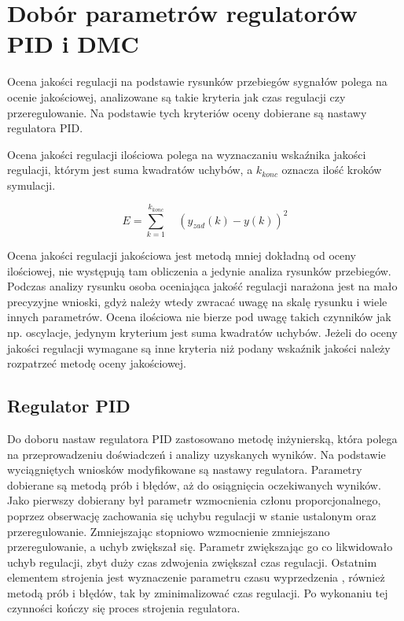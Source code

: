 \section{Dobór parametrów regulatorów PID i DMC}
Ocena jakości regulacji na podstawie rysunków przebiegów sygnałów polega na ocenie jakościowej, 
analizowane są takie kryteria jak czas regulacji czy przeregulowanie. 
Na podstawie tych kryteriów oceny dobierane są nastawy regulatora PID.

Ocena jakości regulacji ilościowa polega na wyznaczaniu wskaźnika jakości regulacji, 
którym jest suma kwadratów uchybów, a $k_{konc}$ oznacza ilość kroków symulacji. 



$$
E=\sum_{k=1}^{k_{konc}} \quad (y_{zad}(k)-y(k))^{2}
$$

Ocena jakości regulacji jakościowa jest metodą mniej dokładną od oceny ilościowej, 
nie występują tam obliczenia a jedynie analiza rysunków przebiegów. 
Podczas analizy rysunku osoba oceniająca jakość regulacji narażona jest na mało precyzyjne wnioski, 
gdyż należy wtedy zwracać uwagę na skalę rysunku i wiele innych parametrów. 
Ocena ilościowa nie bierze pod uwagę takich czynników jak np. oscylacje, 
jedynym kryterium jest suma kwadratów uchybów. 
Jeżeli do oceny jakości regulacji wymagane są inne kryteria niż podany wskaźnik jakości 
należy rozpatrzeć metodę oceny jakościowej.

\subsection{Regulator PID}

Do doboru nastaw regulatora PID zastosowano metodę inżynierską, 
która polega na przeprowadzeniu doświadczeń i analizy uzyskanych wyników. 
Na podstawie wyciągniętych wniosków modyfikowane są nastawy regulatora. 
Parametry  dobierane są metodą prób i błędów, aż do osiągnięcia oczekiwanych wyników. 
Jako pierwszy dobierany był parametr wzmocnienia członu proporcjonalnego, 
poprzez obserwację zachowania się uchybu regulacji w stanie ustalonym oraz przeregulowanie. 
Zmniejszając stopniowo wzmocnienie zmniejszano przeregulowanie, a uchyb zwiększał się. 
Parametr  zwiększając go co likwidowało uchyb regulacji,  
zbyt duży czas zdwojenia zwiększał czas regulacji. 
Ostatnim elementem strojenia jest wyznaczenie parametru czasu wyprzedzenia , 
również metodą prób i błędów, tak by zminimalizować czas regulacji. 
Po wykonaniu tej czynności kończy się proces strojenia regulatora.


